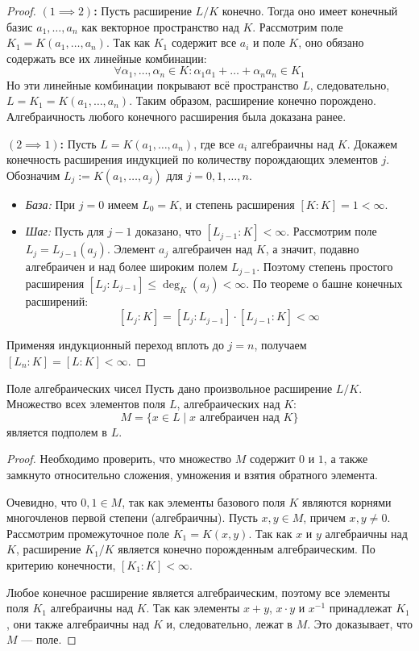 \begin{proof}
	\textbf{$(1 \implies 2)$:} Пусть расширение $L/K$ конечно. Тогда оно имеет конечный базис $a_1, \dots, a_n$ как векторное пространство над $K$. 
	Рассмотрим поле $K_1 = K(a_1, \dots, a_n)$. Так как $K_1$ содержит все $a_i$ и поле $K$, оно обязано содержать все их линейные комбинации:
	\[ \forall \alpha_1, \dots, \alpha_n \in K: \alpha_1 a_1 + \dots + \alpha_n a_n \in K_1 \]
	Но эти линейные комбинации покрывают всё пространство $L$, следовательно, $L = K_1 = K(a_1, \dots, a_n)$. Таким образом, расширение конечно порождено. Алгебраичность любого конечного расширения была доказана ранее.
	
	\textbf{$(2 \implies 1)$:} Пусть $L = K(a_1, \dots, a_n)$, где все $a_i$ алгебраичны над $K$. Докажем конечность расширения индукцией по количеству порождающих элементов $j$.
	Обозначим $L_j := K(a_1, \dots, a_j)$ для $j = 0, 1, \dots, n$.
	\begin{itemize}
		\item \textit{База:} При $j=0$ имеем $L_0 = K$, и степень расширения $[K:K] = 1 < \infty$.
		\item \textit{Шаг:} Пусть для $j-1$ доказано, что $[L_{j-1}:K] < \infty$.
		Рассмотрим поле $L_j = L_{j-1}(a_j)$. Элемент $a_j$ алгебраичен над $K$, а значит, подавно алгебраичен и над более широким полем $L_{j-1}$. 
		Поэтому степень простого расширения $[L_j:L_{j-1}] \le \deg_K(a_j) < \infty$.
		По теореме о башне конечных расширений:
		\[ [L_j:K] = [L_j:L_{j-1}] \cdot [L_{j-1}:K] < \infty \]
	\end{itemize}
	Применяя индукционный переход вплоть до $j=n$, получаем $[L_n:K] = [L:K] < \infty$.
\end{proof}

\begin{Proposition}{Поле алгебраических чисел}{}
	Пусть дано произвольное расширение $L/K$. Множество всех элементов поля $L$, алгебраических над $K$:
	\[ M = \{ x \in L \mid x \text{ алгебраичен над } K \} \]
	является подполем в $L$.
\end{Proposition}

\begin{proof}
	Необходимо проверить, что множество $M$ содержит $0$ и $1$, а также замкнуто относительно сложения, умножения и взятия обратного элемента.
	
	Очевидно, что $0, 1 \in M$, так как элементы базового поля $K$ являются корнями многочленов первой степени (алгебраичны).
	Пусть $x, y \in M$, причем $x, y \neq 0$. Рассмотрим промежуточное поле $K_1 = K(x, y)$. 
	Так как $x$ и $y$ алгебраичны над $K$, расширение $K_1/K$ является конечно порожденным алгебраическим. 
	По критерию конечности, $[K_1:K] < \infty$.
	
	Любое конечное расширение является алгебраическим, поэтому все элементы поля $K_1$ алгебраичны над $K$. 
	Так как элементы $x+y$, $x \cdot y$ и $x^{-1}$ принадлежат $K_1$, они также алгебраичны над $K$ и, следовательно, лежат в $M$. Это доказывает, что $M$ --- поле.
\end{proof}

